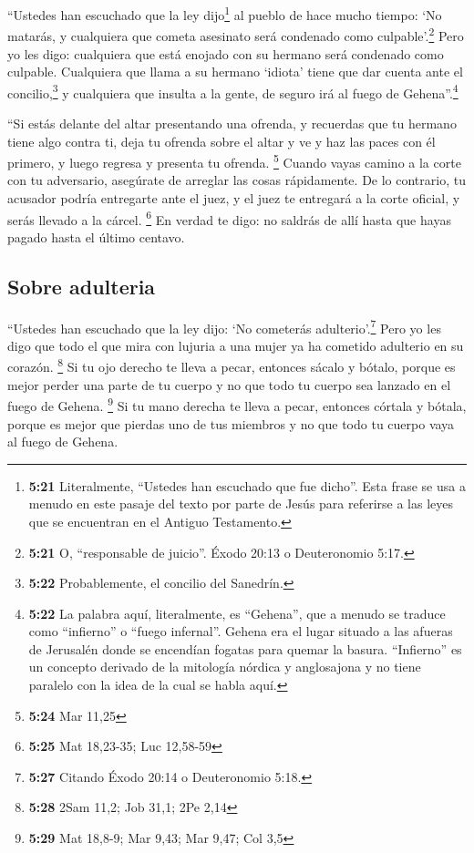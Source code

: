  ``Ustedes han escuchado que la ley dijo\footnote{\textbf{5:21}
  Literalmente, ``Ustedes han escuchado que fue dicho''. Esta frase se
  usa a menudo en este pasaje del texto por parte de Jesús para
  referirse a las leyes que se encuentran en el Antiguo Testamento.} al
pueblo de hace mucho tiempo: `No matarás, y cualquiera que cometa
asesinato será condenado como culpable'.\footnote{\textbf{5:21} O,
  ``responsable de juicio''. Éxodo 20:13 o Deuteronomio 5:17.}
 Pero yo les digo: cualquiera que está enojado con su
hermano será condenado como culpable. Cualquiera que llama a su hermano
`idiota' tiene que dar cuenta ante el concilio,\footnote{\textbf{5:22}
  Probablemente, el concilio del Sanedrín.} y cualquiera que insulta a
la gente, de seguro irá al fuego de Gehena''.\footnote{\textbf{5:22} La
  palabra aquí, literalmente, es ``Gehena'', que a menudo se traduce
  como ``infierno'' o ``fuego infernal''. Gehena era el lugar situado a
  las afueras de Jerusalén donde se encendían fogatas para quemar la
  basura. ``Infierno'' es un concepto derivado de la mitología nórdica y
  anglosajona y no tiene paralelo con la idea de la cual se habla aquí.}

 ``Si estás delante del altar presentando una ofrenda, y
recuerdas que tu hermano tiene algo contra ti,  deja tu
ofrenda sobre el altar y ve y haz las paces con él primero, y luego
regresa y presenta tu ofrenda. \footnote{\textbf{5:24} Mar 11,25}
 Cuando vayas camino a la corte con tu adversario,
asegúrate de arreglar las cosas rápidamente. De lo contrario, tu
acusador podría entregarte ante el juez, y el juez te entregará a la
corte oficial, y serás llevado a la cárcel. \footnote{\textbf{5:25} Mat
  18,23-35; Luc 12,58-59}  En verdad te digo: no saldrás
de allí hasta que hayas pagado hasta el último centavo.

\hypertarget{sobre-adulteria}{%
\subsection{Sobre adulteria}\label{sobre-adulteria}}

 ``Ustedes han escuchado que la ley dijo: `No cometerás
adulterio'.\footnote{\textbf{5:27} Citando Éxodo 20:14 o Deuteronomio
  5:18.}  Pero yo les digo que todo el que mira con
lujuria a una mujer ya ha cometido adulterio en su corazón. \footnote{\textbf{5:28}
  2Sam 11,2; Job 31,1; 2Pe 2,14}  Si tu ojo derecho te
lleva a pecar, entonces sácalo y bótalo, porque es mejor perder una
parte de tu cuerpo y no que todo tu cuerpo sea lanzado en el fuego de
Gehena. \footnote{\textbf{5:29} Mat 18,8-9; Mar 9,43; Mar 9,47; Col 3,5}
 Si tu mano derecha te lleva a pecar, entonces córtala y
bótala, porque es mejor que pierdas uno de tus miembros y no que todo tu
cuerpo vaya al fuego de Gehena.

